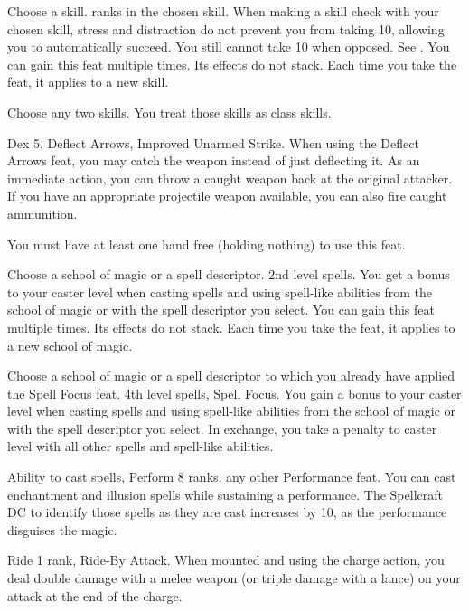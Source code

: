 Choose a skill.
 ranks in the chosen skill.
\featben When making a skill check with your chosen skill, stress and distraction do not prevent you from taking 10, allowing you to automatically succeed. You still cannot take 10 when opposed. See .
 You can gain this feat multiple times. Its effects do not stack. Each time you take the feat, it applies to a new skill.

\featben Choose any two skills. You treat those skills as class skills.

 Dex 5, Deflect Arrows, Improved Unarmed Strike.
 When using the Deflect Arrows feat, you may catch the weapon instead of just deflecting it. As an immediate action, you can throw a caught weapon back at the original attacker. If you have an appropriate projectile weapon available, you can also fire caught ammunition.
\par You must have at least one hand free (holding nothing) to use this feat.

Choose a school of magic or a spell descriptor.
 2nd level spells.
 You get a  bonus to your caster level when casting spells and using spell-like abilities from the school of magic or with the spell descriptor you select.
 You can gain this feat multiple times. Its effects do not stack. Each time you take the feat, it applies to a new school of magic.

Choose a school of magic or a spell descriptor to which you already have applied the Spell Focus feat.
\featpre 4th level spells, Spell Focus.
\featben You gain a  bonus to your caster level when casting spells and using spell-like abilities from the school of magic or with the spell descriptor you select. In exchange, you take a  penalty to caster level with all other spells and spell-like abilities.

\featpre Ability to cast spells, Perform 8 ranks, any other Performance feat.
\featben You can cast enchantment and illusion spells while sustaining a performance. The Spellcraft DC to identify those spells as they are cast increases by 10, as the performance disguises the magic.

 Ride 1 rank, Ride-By Attack.
 When mounted and using the charge action, you deal double damage with a melee weapon (or triple damage with a lance) on your attack at the end of the charge.%

